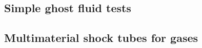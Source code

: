 \documentclass[final,3p,twocolumn]{elsarticle}
\begin{document}
\subsection{Simple ghost fluid tests}
\label{subsec:toro}

\subsection{Multimaterial shock tubes for gases}
\label{subsec:shocktubes}

%
%
%
%
%
\end{document}
